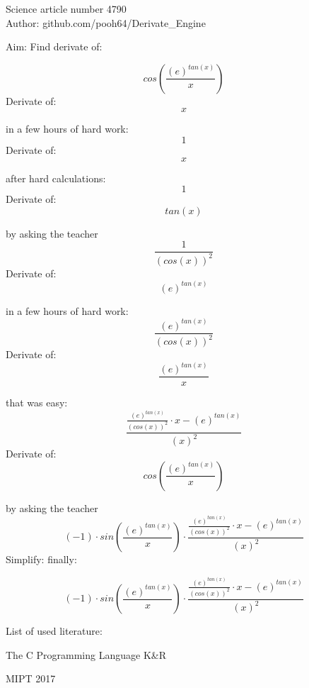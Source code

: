 \documentclass[12pt]{article}
\begin{document}
\begin{center}Science article number 4790\\Author: github.com/pooh64/Derivate\_Engine     

Aim: Find derivate of:\end{center}\[
cos\left(\frac{{\left(e\right)}^{tan\left(x\right)}}{x}\right)
\]
Derivate of:\[
x
\]

in a few hours of hard work:
\[
1
\]
Derivate of:\[
x
\]

after hard calculations:
\[
1
\]
Derivate of:\[
tan\left(x\right)
\]

by asking the teacher
\[
\frac{1}{{\left(cos\left(x\right)\right)}^{2}}
\]
Derivate of:\[
{\left(e\right)}^{tan\left(x\right)}
\]

in a few hours of hard work:
\[
\frac{{\left(e\right)}^{tan\left(x\right)}}{{\left(cos\left(x\right)\right)}^{2}}
\]
Derivate of:\[
\frac{{\left(e\right)}^{tan\left(x\right)}}{x}
\]

that was easy:
\[
\frac{\frac{{\left(e\right)}^{tan\left(x\right)}}{{\left(cos\left(x\right)\right)}^{2}} \cdot x-{\left(e\right)}^{tan\left(x\right)}}{{\left(x\right)}^{2}}
\]
Derivate of:\[
cos\left(\frac{{\left(e\right)}^{tan\left(x\right)}}{x}\right)
\]

by asking the teacher
\[
(-1) \cdot sin\left(\frac{{\left(e\right)}^{tan\left(x\right)}}{x}\right) \cdot \frac{\frac{{\left(e\right)}^{tan\left(x\right)}}{{\left(cos\left(x\right)\right)}^{2}} \cdot x-{\left(e\right)}^{tan\left(x\right)}}{{\left(x\right)}^{2}}
\]
Simplify:
finally:

\[
(-1) \cdot sin\left(\frac{{\left(e\right)}^{tan\left(x\right)}}{x}\right) \cdot \frac{\frac{{\left(e\right)}^{tan\left(x\right)}}{{\left(cos\left(x\right)\right)}^{2}} \cdot x-{\left(e\right)}^{tan\left(x\right)}}{{\left(x\right)}^{2}}
\]

List of used literature:

 The C Programming Language K\&R

MIPT 2017
\end{document}
